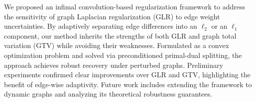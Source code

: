We proposed an infimal convolution-based regularization framework to address the sensitivity of graph Laplacian regularization (GLR) to edge weight uncertainties. 
By adaptively separating edge differences into an $\ell_{2}$ or an $\ell_1$ component, our method inherits the strengths of both GLR and graph total variation (GTV) while avoiding their weaknesses. 
Formulated as a convex optimization problem and solved via preconditioned primal-dual splitting, the approach achieves robust recovery under perturbed graphs. 
Preliminary experiments confirmed clear improvements over GLR and GTV, highlighting the benefit of edge-wise adaptivity. 
Future work includes extending the framework to dynamic graphs and analyzing its theoretical robustness guarantees.